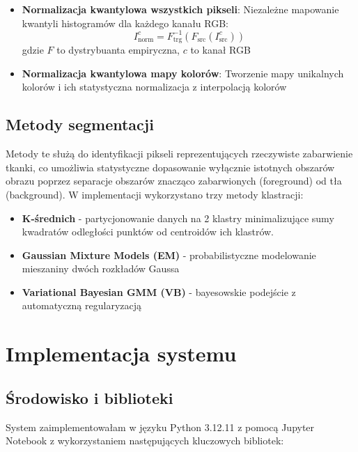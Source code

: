 \documentclass{article}
\begin{document}
\begin{itemize}
    \item \textbf{Normalizacja kwantylowa wszystkich pikseli}: Niezależne mapowanie kwantyli histogramów dla każdego kanału RGB:
    \begin{equation}
        I_{\text{norm}}^c = F_{\text{trg}}^{-1}(F_{\text{src}}(I_{\text{src}}^c))
    \end{equation}
    gdzie $F$ to dystrybuanta empiryczna, $c$ to kanał RGB
    
    \item \textbf{Normalizacja kwantylowa mapy kolorów}: Tworzenie mapy unikalnych kolorów i ich statystyczna normalizacja z interpolacją kolorów
\end{itemize}
\subsection{Metody segmentacji}
Metody te służą do identyfikacji pikseli reprezentujących rzeczywiste zabarwienie tkanki, co umożliwia statystyczne dopasowanie wyłącznie istotnych obszarów obrazu poprzez separacje obszarów znacząco zabarwionych (foreground) od tła (background). W implementacji wykorzystano trzy metody klastracji:

\begin{itemize}
    \item \textbf{K-średnich} - partycjonowanie danych na 2 klastry minimalizujące sumy kwadratów odległości punktów od centroidów ich klastrów.
    \item \textbf{Gaussian Mixture Models (EM)} - probabilistyczne modelowanie mieszaniny dwóch rozkładów Gaussa
    \item \textbf{Variational Bayesian GMM (VB)} - bayesowskie podejście z automatyczną regularyzacją
\end{itemize}
\section{Implementacja systemu}

\subsection{Środowisko i biblioteki}

System zaimplementowałam w języku Python 3.12.11 z pomocą Jupyter Notebook z wykorzystaniem następujących kluczowych bibliotek:
\end{document}
